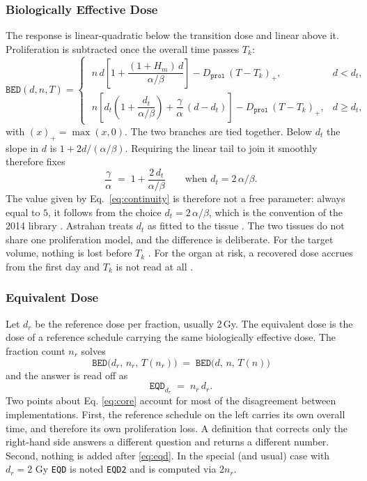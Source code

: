 \documentclass[preprint,12pt,number]{elsarticle}
\begin{document}
\subsubsection{Biologically Effective Dose}
The response is linear-quadratic below the transition dose and linear above it. Proliferation is subtracted once the overall time passes $T_k$:
    \begin{equation}
    \texttt{BED}(d,n,T) =
    \begin{cases}
    \; n\,d\left[1 + \dfrac{(1+H_m)\,d}{\alpha/\beta}\right] - D_\texttt{prol}\,(T-T_k)_{+}, & d < d_t,\\[2.2ex]
    \; n\left[d_t\left(1 + \dfrac{d_t}{\alpha/\beta}\right)  + \dfrac{\gamma}{\alpha}\,(d-d_t)\right] - D_\texttt{prol}\,(T-T_k)_{+}, & d \geq d_t,
    \end{cases}
    \label{eq:bed}
    \end{equation}
with $(x)_{+} = \max(x,0)$. The two branches are tied together. Below $d_t$ the slope in $d$ is $1 + 2d/(\alpha/\beta)$. Requiring the linear tail to join it smoothly therefore fixes
    \begin{equation}
    \frac{\gamma}{\alpha} \;=\; 1 + \frac{2\,d_t}{\alpha/\beta} \qquad \text{when } d_t = 2\,\alpha/\beta .
    \label{eq:continuity}
    \end{equation}
The value given by Eq.~\eqref{eq:continuity} is therefore not a free parameter: always equal to $5$, it follows from the choice $d_t = 2\,\alpha/\beta$, which is the convention of the 2014 library \cite{voyant2014}. Astrahan treats $d_t$ as fitted to the tissue \cite{astrahan2008}. The two tissues do not share one proliferation model, and the difference is deliberate. For the target volume, nothing is lost before $T_k$ \cite{dale1989,withers1988}. For the organ at risk, a recovered dose accrues from the first day and $T_k$ is not read at all \cite{vandyk1989}.

\subsubsection{Equivalent Dose}
Let $d_r$ be the reference dose per fraction, usually 2\,Gy. The equivalent dose is the dose of a reference schedule carrying the same biologically effective dose. The fraction count $n_r$ solves
    \begin{equation}
    \;\texttt{BED}\big(d_r,\,n_r,\,T(n_r)\big) \;=\; \texttt{BED}\big(d,\,n,\,T(n)\big)\;
    \label{eq:core}
    \end{equation}
and the answer is read off as
    \begin{equation}
    \texttt{EQD}_{d_r} \;=\; n_r\,d_r .
    \label{eq:eqd}
    \end{equation}
Two points about Eq. \eqref{eq:core} account for most of the disagreement between implementations. First, the reference schedule on the left carries its own overall time, and therefore its own proliferation loss. A definition that corrects only the right-hand side answers a different question and returns a different number. Second, nothing is added after \eqref{eq:eqd}. In the special (and usual) case with $d_r=2$ Gy \texttt{EQD} is noted \texttt{EQD2} and is computed via $2n_r$.
\end{document}
